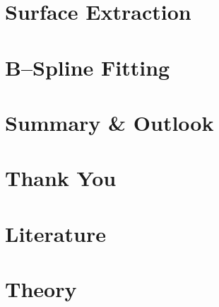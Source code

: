 \documentclass[9pt,pdftex]{beamer}
\begin{document}
\section{Surface Extraction}



\section{B--Spline Fitting}

\section{Summary \& Outlook}

\section*{Thank You}

\section*{Literature}

\section*{Theory}

\end{document}
